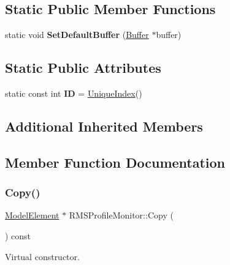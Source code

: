 \subsection*{Static Public Member Functions}
\begin{DoxyCompactItemize}
\item 
\mbox{\label{classRMSProfileMonitor_a1671c03412c4e039241fdd58fe798b18}} 
static void {\bfseries Set\+Default\+Buffer} (\hyperlink{classRMSProfileMonitor_1_1Buffer}{Buffer} $\ast$buffer)
\end{DoxyCompactItemize}
\subsection*{Static Public Attributes}
\begin{DoxyCompactItemize}
\item 
\mbox{\label{classRMSProfileMonitor_ae60df9ace4d5c454e7b759b529b5e7b8}} 
static const int {\bfseries ID} = \hyperlink{classAcceleratorComponent_aa7ad4d39e1a488b705983842ed1ac784}{Unique\+Index}()
\end{DoxyCompactItemize}
\subsection*{Additional Inherited Members}


\subsection{Member Function Documentation}
\mbox{\label{classRMSProfileMonitor_a44abc9eaa3a638c8fffadc81a3728b6e}} 
\subsubsection{\texorpdfstring{Copy()}{Copy()}}
{\footnotesize\ttfamily \hyperlink{classModelElement}{Model\+Element} $\ast$ R\+M\+S\+Profile\+Monitor\+::\+Copy (\begin{DoxyParamCaption}{ }\end{DoxyParamCaption}) const\hspace{0.3cm}{\ttfamily [virtual]}}

Virtual constructor. 

